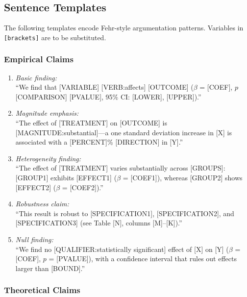 \subsection{Sentence Templates}

The following templates encode Fehr-style argumentation patterns. Variables
in \texttt{[brackets]} are to be substituted.

\subsubsection{Empirical Claims}

\begin{enumerate}[label=\textbf{E\arabic*.}, leftmargin=2.5cm]
\item \textit{Basic finding:} \\
``We find that [VARIABLE] [VERB:affects] [OUTCOME] ($\beta$ = [COEF],
$p$ [COMPARISON] [PVALUE], 95\% CI: [LOWER], [UPPER]).''

\item \textit{Magnitude emphasis:} \\
``The effect of [TREATMENT] on [OUTCOME] is [MAGNITUDE:substantial]---a
one standard deviation increase in [X] is associated with a [PERCENT]\%
[DIRECTION] in [Y].''

\item \textit{Heterogeneity finding:} \\
``The effect of [TREATMENT] varies substantially across [GROUPS]:
[GROUP1] exhibits [EFFECT1] ($\beta$ = [COEF1]), whereas [GROUP2]
shows [EFFECT2] ($\beta$ = [COEF2]).''

\item \textit{Robustness claim:} \\
``This result is robust to [SPECIFICATION1], [SPECIFICATION2], and
[SPECIFICATION3] (see Table [N], columns [M]--[K]).''

\item \textit{Null finding:} \\
``We find no [QUALIFIER:statistically significant] effect of [X] on [Y]
($\beta$ = [COEF], $p$ = [PVALUE]), with a confidence interval that
rules out effects larger than [BOUND].''
\end{enumerate}

\subsubsection{Theoretical Claims}

